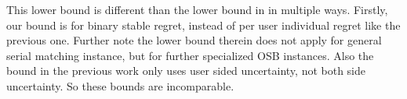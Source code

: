 \documentclass{article}
\begin{document}
This lower bound is different than the lower bound in \cite{ucbd3} in multiple ways. Firstly, our bound is for binary stable regret, instead of per user individual regret like the previous one. Further note the lower bound therein does not apply for general serial matching instance, but for further specialized OSB instances. Also the bound in the previous work only uses user sided uncertainty, not both side uncertainty. So these bounds are incomparable. 



\end{document}
